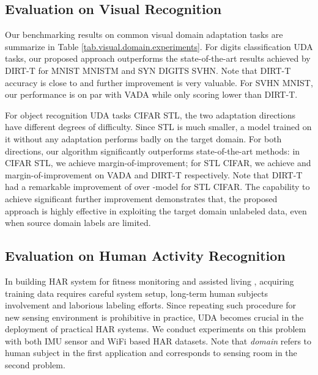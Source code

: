 \subsection{Evaluation on Visual Recognition}
Our benchmarking results on common visual domain adaptation tasks are summarize in Table \ref{tab.visual.domain.experiments}. For digits classification UDA tasks, our proposed approach outperforms the state-of-the-art results achieved by DIRT-T for MNIST  MNISTM and SYN DIGITS  SVHN. Note that DIRT-T accuracy is close to  and further improvement is very valuable. For SVHN  MNIST, our performance is on par with VADA while only scoring lower than DIRT-T. 











For object recognition UDA tasks CIFAR STL, the two adaptation directions have different degrees of difficulty. Since STL is much smaller, a model trained on it without any adaptation performs badly on the target domain. For both directions, our algorithm significantly outperforms state-of-the-art methods: in CIFAR  STL, we achieve  margin-of-improvement; for STL  CIFAR, we achieve  and  margin-of-improvement on VADA and DIRT-T respectively. Note that DIRT-T had a remarkable improvement of  over -model for STL  CIFAR. The capability to achieve significant further improvement demonstrates that, the proposed approach is highly effective in exploiting the target domain unlabeled data, even when source domain labels are limited.

























\subsection{Evaluation on Human Activity Recognition}
In building HAR system for fitness monitoring and assisted living \cite{mohr2017personal,song2018optimizing}, acquiring training data requires careful system setup, long-term human subjects involvement and laborious labeling efforts. Since repeating such procedure for new sensing environment is prohibitive in practice, UDA becomes crucial in the deployment of practical HAR systems. We conduct experiments on this problem with both IMU sensor and WiFi based HAR datasets. Note that \textit{domain} refers to human subject in the first application and corresponds to sensing room in the second problem. 




